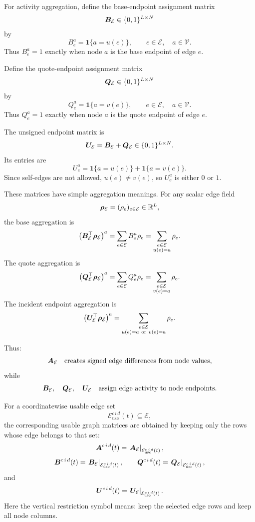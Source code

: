 For activity aggregation, define the base-endpoint assignment matrix
\[
  \bm{B}_{\mathcal{E}}
  \in
  \{0,1\}^{L\times N}
\]
by
\[
  B_{e}^{a}
  =
  \mathbf{1}\{a=u(e)\},
  \qquad
  e\in\mathcal{E},
  \quad
  a\in\mathcal{V}.
\]
Thus $B_{e}^{a}=1$ exactly when node $a$ is the base endpoint of edge $e$.

Define the quote-endpoint assignment matrix
\[
  \bm{Q}_{\mathcal{E}}
  \in
  \{0,1\}^{L\times N}
\]
by
\[
  Q_{e}^{a}
  =
  \mathbf{1}\{a=v(e)\},
  \qquad
  e\in\mathcal{E},
  \quad
  a\in\mathcal{V}.
\]
Thus $Q_{e}^{a}=1$ exactly when node $a$ is the quote endpoint of edge $e$.

The unsigned endpoint matrix is
\[
  \bm{U}_{\mathcal{E}}
  =
  \bm{B}_{\mathcal{E}}
  +
  \bm{Q}_{\mathcal{E}}
  \in
  \{0,1\}^{L\times N}.
\]
Its entries are
\[
  U_{e}^{a}
  =
  \mathbf{1}\{a=u(e)\}
  +
  \mathbf{1}\{a=v(e)\}.
\]
Since self-edges are not allowed, $u(e)\ne v(e)$, so
$U_{e}^{a}$ is either $0$ or $1$.

These matrices have simple aggregation meanings.  For any scalar edge field
\[
  \bm{\rho}_{\mathcal{E}}
  =
  (\rho_e)_{e\in\mathcal{E}}
  \in
  \mathbb{R}^{L},
\]
the base aggregation is
\[
  \left(
    \bm{B}_{\mathcal{E}}^{\top}
    \bm{\rho}_{\mathcal{E}}
  \right)^{a}
  =
  \sum_{e\in\mathcal{E}}
  B_{e}^{a}\rho_e
  =
  \sum_{\substack{e\in\mathcal{E}\\u(e)=a}}
  \rho_e.
\]
The quote aggregation is
\[
  \left(
    \bm{Q}_{\mathcal{E}}^{\top}
    \bm{\rho}_{\mathcal{E}}
  \right)^{a}
  =
  \sum_{e\in\mathcal{E}}
  Q_{e}^{a}\rho_e
  =
  \sum_{\substack{e\in\mathcal{E}\\v(e)=a}}
  \rho_e.
\]
The incident endpoint aggregation is
\[
  \left(
    \bm{U}_{\mathcal{E}}^{\top}
    \bm{\rho}_{\mathcal{E}}
  \right)^{a}
  =
  \sum_{\substack{e\in\mathcal{E}\\u(e)=a\ \mathrm{or}\ v(e)=a}}
  \rho_e.
\]

Thus:
\[
  \bm{A}_{\mathcal{E}}
  \quad
  \text{creates signed edge differences from node values},
\]
while
\[
  \bm{B}_{\mathcal{E}},
  \quad
  \bm{Q}_{\mathcal{E}},
  \quad
  \bm{U}_{\mathcal{E}}
  \quad
  \text{assign edge activity to node endpoints}.
\]

For a coordinatewise usable edge set
\[
  \mathcal{E}_{\mathrm{use}}^{c\,i\,d}(t)
  \subseteq
  \mathcal{E},
\]
the corresponding usable graph matrices are obtained by keeping only the rows
whose edge belongs to that set:
\[
  \bm{A}^{c\,i\,d}(t)
  =
  \left.
    \bm{A}_{\mathcal{E}}
  \right|_{\mathcal{E}_{\mathrm{use}}^{c\,i\,d}(t)},
\]
\[
  \bm{B}^{c\,i\,d}(t)
  =
  \left.
    \bm{B}_{\mathcal{E}}
  \right|_{\mathcal{E}_{\mathrm{use}}^{c\,i\,d}(t)},
  \qquad
  \bm{Q}^{c\,i\,d}(t)
  =
  \left.
    \bm{Q}_{\mathcal{E}}
  \right|_{\mathcal{E}_{\mathrm{use}}^{c\,i\,d}(t)},
\]
and
\[
  \bm{U}^{c\,i\,d}(t)
  =
  \left.
    \bm{U}_{\mathcal{E}}
  \right|_{\mathcal{E}_{\mathrm{use}}^{c\,i\,d}(t)}.
\]
Here the vertical restriction symbol means: keep the selected edge rows and keep
all node columns.

